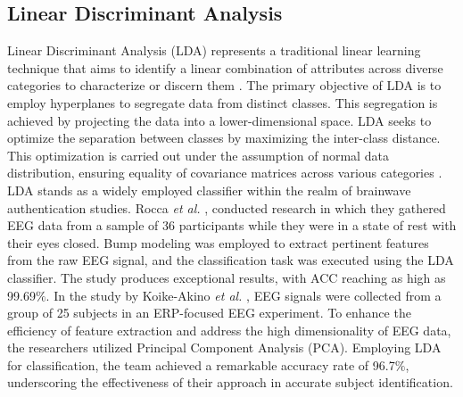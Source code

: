 {\subsection{Linear Discriminant Analysis}
Linear Discriminant Analysis (LDA) represents a traditional linear learning technique that aims to identify a linear combination of attributes across diverse categories to characterize or discern them \cite{zhang2021review}. The primary objective of LDA is to employ hyperplanes to segregate data from distinct classes. This segregation is achieved by projecting the data into a lower-dimensional space. LDA seeks to optimize the separation between classes by maximizing the inter-class distance. This optimization is carried out under the assumption of normal data distribution, ensuring equality of covariance matrices across various categories \cite{survey_brain_biometrics}. LDA stands as a widely employed classifier within the realm of brainwave authentication studies. Rocca \textit{et al.} \cite{la2013eeg}, conducted research in which they gathered EEG data from a sample of 36 participants while they were in a state of rest with their eyes closed. Bump modeling was employed to extract pertinent features from the raw EEG signal, and the classification task was executed using the LDA classifier. 
The study produces exceptional results, with ACC reaching as high as 99.69$\%$. In the study by Koike-Akino \textit{et al.} \cite{koike2016high}, EEG signals were collected from a group of 25 subjects in an ERP-focused EEG experiment. To enhance the efficiency of feature extraction and address the high dimensionality of EEG data, the researchers utilized Principal Component Analysis (PCA). Employing LDA for classification, the team achieved a remarkable accuracy rate of 96.7$\%$, underscoring the effectiveness of their approach in accurate subject identification. 

}
